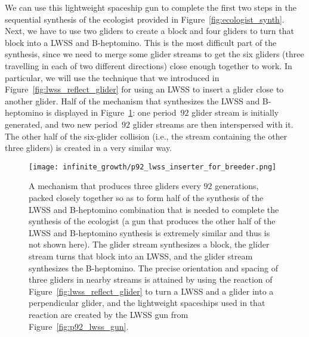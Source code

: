 We can use this lightweight spaceship gun to complete the first two steps in the sequential synthesis of the ecologist provided in Figure~\ref{fig:ecologist_synth}. Next, we have to use two gliders to create a block and four gliders to turn that block into a LWSS and B-heptomino. This is the most difficult part of the synthesis, since we need to merge some glider streams to get the six gliders (three travelling in each of two different directions) close enough together to work. In particular, we will use the technique that we introduced in Figure~\ref{fig:lwss_reflect_glider} for using an LWSS to insert a glider close to another glider. Half of the mechanism that synthesizes the LWSS and B-heptomino is displayed in Figure~\ref{fig:p92_lwss_inserter_for_breeder}: one period~$92$ glider stream is initially generated, and two new period~$92$ glider streams are then interspersed with it. The other half of the six-glider collision (i.e., the stream containing the other three gliders) is created in a very similar way.
\begin{figure}[!ht]
	\centering\texttt{[image: infinite\_growth/p92\_lwss\_inserter\_for\_breeder.png]}
	\caption{A mechanism that produces three gliders every $92$ generations, packed closely together so as to form half of the synthesis of the LWSS and B-heptomino combination that is needed to complete the synthesis of the ecologist (a gun that produces the other half of the LWSS and B-heptomino synthesis is extremely similar and thus is not shown here). The  glider stream synthesizes a block, the  glider stream turns that block into an LWSS, and the  glider stream synthesizes the B-heptomino. The precise orientation and spacing of three gliders in nearby streams is attained by using the reaction of Figure~\ref{fig:lwss_reflect_glider} to turn a LWSS and a glider into a perpendicular glider, and the lightweight spaceships used in that reaction are created by the LWSS gun from Figure~\ref{fig:p92_lwss_gun}.}\label{fig:p92_lwss_inserter_for_breeder}
\end{figure}

